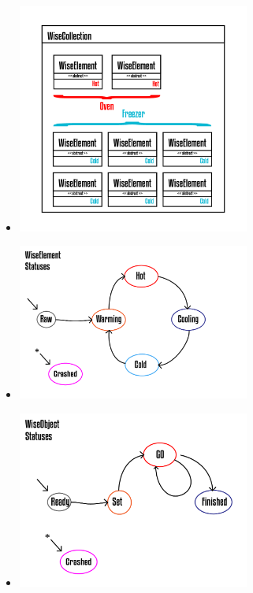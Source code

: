 \documentclass[10pt]{beamer}
\theoremstyle{remark}
\theoremstyle{definition}
\begin{document}
\begin{frame}[allowframebreaks]
\begin{itemize}
	\end{itemize}

	\framebreak
	\begin{itemize}
	
	\item \includegraphics[width=0.6\textwidth]{images/Prancheta 17@4x.png}
	
	\end{itemize}

	\framebreak
	\begin{itemize}
	
	\item \includegraphics[width=0.6\textwidth]{images/Prancheta 7@4x.png}
	
	\end{itemize}

	\framebreak
	\begin{itemize}
	
	\item \includegraphics[width=0.6\textwidth]{images/Prancheta 16@4x.png}
	

\end{itemize}
\end{frame}
\end{document}
